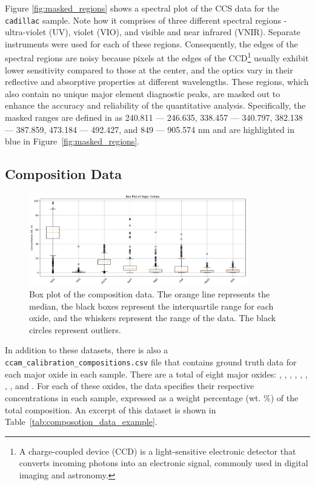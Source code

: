Figure \ref{fig:masked_regions} shows a spectral plot of the CCS data for the \texttt{cadillac} sample.
Note how it comprises of three different spectral regions - ultra-violet (UV), violet (VIO), and visible and near infrared (VNIR).
Separate instruments were used for each of these regions.
Consequently, the edges of the spectral regions are noisy because pixels at the edges of the CCD\footnote{A charge-coupled device (CCD) is a light-sensitive electronic detector that converts incoming photons into an electronic signal, commonly used in digital imaging and astronomy\cite{radionuclide_imaging}.} usually exhibit lower sensitivity compared to those at the center, and the optics vary in their reflective and absorptive properties at different wavelengths.
These regions, which also contain no unique major element diagnostic peaks, are masked out to enhance the accuracy and reliability of the quantitative analysis\cite{cleggRecalibrationMarsScience2017}.
Specifically, the masked ranges are defined in \citet{cleggRecalibrationMarsScience2017} as 240.811 --- 246.635, 338.457 --- 340.797, 382.138 --- 387.859, 473.184 --- 492.427, and 849 --- 905.574 nm and are highlighted in blue in Figure~\ref{fig:masked_regions}.

\subsection{Composition Data}\label{subsec:composition_data}
\begin{figure}[t]
	\centering
	\includegraphics[width=0.85\textwidth]{images/composition_box_plot.png}
	\caption{Box plot of the composition data. The orange line represents the median, the black boxes represent the interquartile range for each oxide, and the whiskers represent the range of the data. The black circles represent outliers.}
	\label{fig:composition_box_plot}
\end{figure}

In addition to these datasets, there is also a \\ \texttt{ccam\_calibration\_compositions.csv} file that contains ground truth data for each major oxide in each sample.
There are a total of eight major oxides: , , , , , , , , and .
For each of these oxides, the data specifies their respective concentrations in each sample, expressed as a weight percentage (wt. \%) of the total composition.
An excerpt of this dataset is shown in Table~\ref{tab:composotion_data_example}.



